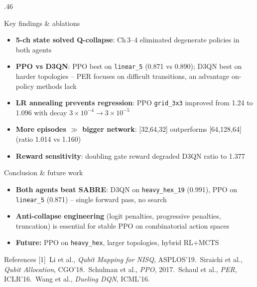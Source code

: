\documentclass[final]{beamer}
\begin{document}
\begin{frame}[fragile]{}
\begin{columns}[t]
\begin{column}{.46\textwidth}
\begin{block}{Key findings \& ablations}
{\small
\begin{itemize}
  \item \textbf{5-ch state solved Q-collapse}: Ch\,3--4 eliminated degenerate policies in both agents
  \item \textbf{PPO vs D3QN}: PPO best on \texttt{linear\_5} (0.871 vs 0.890); D3QN best on harder topologies -- PER focuses on difficult transitions, an advantage on-policy methods lack
  \item \textbf{LR annealing prevents regression}: PPO \texttt{grid\_3x3} improved from 1.24 to 1.096 with decay $3{\times}10^{-4}{\to}3{\times}10^{-5}$
  \item \textbf{More episodes $\gg$ bigger network}: [32,64,32] outperforms [64,128,64] (ratio 1.014 vs 1.160)
  \item \textbf{Reward sensitivity}: doubling gate reward degraded D3QN ratio to 1.377
\end{itemize}
}
\end{block}

\vspace{0.05cm}

\begin{block}{Conclusion \& future work}
{\small
\begin{itemize}
  \item \textbf{Both agents beat SABRE}: D3QN on \texttt{heavy\_hex\_19} (0.991), PPO on \texttt{linear\_5} (0.871) -- single forward pass, no search
  \item \textbf{Anti-collapse engineering} (logit penalties, progressive penalties, truncation) is essential for stable PPO on combinatorial action spaces
  \item \textbf{Future:} PPO on \texttt{heavy\_hex}, larger topologies, hybrid RL+MCTS
\end{itemize}
}
\end{block}

\vspace{0.05cm}

\begin{exampleblock}{References}
\scriptsize
[1]~Li et al., \textit{Qubit Mapping for NISQ}, ASPLOS'19.\;
[2]~Siraichi et al., \textit{Qubit Allocation}, CGO'18.\;
[3]~Schulman et al., \textit{PPO}, 2017.\;
[4]~Schaul et al., \textit{PER}, ICLR'16.\;
[5]~Wang et al., \textit{Dueling DQN}, ICML'16.
\end{exampleblock}

\end{column}
\end{columns}

\end{frame}
\end{document}
